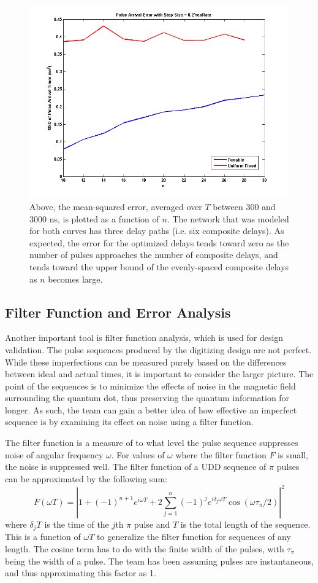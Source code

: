 \documentclass[pdftex,12pt,a4paper]{article}
\begin{document}
\begin{figure}[H]
\centering
\includegraphics[width=0.7\linewidth]{msd_vs_n.png}\caption{Above, the mean-squared error, averaged over $T$ between 300 and 3000 ns, is plotted as a function of $n$. The network that was modeled for both curves has three delay paths (i.e. six composite delays). As expected, the error for the optimized delays tends toward zero as the number of pulses approaches the number of composite delays, and tends toward the upper bound of the evenly-spaced composite delays as $n$ becomes large.}
\label{fig:msd_vs_n}
\end{figure}

\subsection{Filter Function and Error Analysis}
\label{sec:error}
 Another important tool is filter function analysis, which is used for design validation. 
The pulse sequences produced by the digitizing design are not perfect. While these imperfections can be measured purely based on the differences between ideal and actual times, it is important to consider the larger picture. The point of the sequences is to minimize the effects of noise in the magnetic field surrounding the quantum dot, thus preserving the quantum information for longer. As such, the team can gain a better idea of how effective an imperfect sequence is by examining its effect on noise using a filter function\cite{ball_walsh-synthesized_2014}. 


The filter function is a measure of to what level the pulse sequence suppresses noise of angular frequency $\omega$. For values of $\omega$ where the filter function $F$ is small, the noise is suppressed well. The filter function of a UDD sequence of $\pi$ pulses can be approximated by the following sum:
\[F(\omega T) = \left| 1 + (-1)^{n+1} e^{i\omega T} + 2\sum_{j=1}^n(-1)^j e^{i\delta_j\omega T}\cos(\omega \tau_\pi/2)\right|^2\]
where $\delta_j T$ is the time of the $j$th $\pi$ pulse and $T$ is the total length of the sequence\cite{biercuk_optimized_2009}. This is a function of $\omega T$ to generalize the filter function for sequences of any length. The cosine term has to do with the finite width of the pulses, with $\tau_\pi$ being the width of a pulse. The team has been assuming pulses are instantaneous, and thus approximating this factor as 1. 
\end{document}
